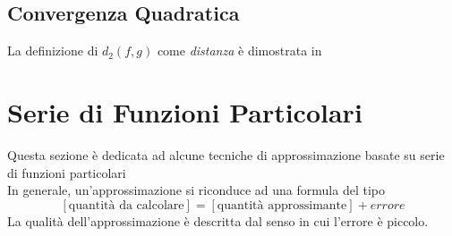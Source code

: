 \subsection{Convergenza Quadratica}\label{sect:conv_quadr}
\begin{proposition}
	\label{def:dist_quadratica}

	La definizione di $d_2(f,g)$ come \textit{distanza} è dimostrata in \hyperref[ex:dim_dist_quadratica]{}
\end{proposition}
\begin{proposition}
	\label{prop:dist_quad_sp_metr_non_compl}
\end{proposition}

\newpage
\section{Serie di Funzioni Particolari}\label{sect:ser_funz_particol}
Questa sezione è dedicata ad alcune tecniche di approssimazione  basate su serie di funzioni particolari\\
In generale, un'approssimazione si riconduce ad una formula del tipo
\[\left[\text{quantità da calcolare}\right]=\left[\text{quantità approssimante}\right]+ errore\]
La qualità dell'approssimazione è descritta dal senso in cui l'errore è piccolo.
